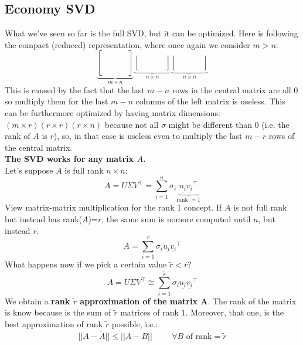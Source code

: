 \subsection{Economy SVD}
What we've seen so far is the full SVD, but it can be optimized. Here is following the compact (reduced) representation, where once again we consider $m > n$:
\[
\underbrace{
  \begin{bmatrix}
    & & & \\
    & & & \\
    & & & \\
    & & & \\
    & & & \\
  \end{bmatrix}}_{m \times n}
\underbrace{
  \begin{bmatrix}
    & & & \\
    & & & \\
    & & & \\
  \end{bmatrix}}_{n \times n}
\underbrace{
  \begin{bmatrix}
    & & & \\
    & & & \\
    & & & \\
  \end{bmatrix}}_{n \times n}
\]
This is caused by the fact that the last $m-n$ rows in the central matrix are all 0 so multiply them for the last $m-n$ columns of the left matrix is useless. This can be furthermore optimized by having matrix dimensions: $(m\times r)(r\times r)(r\times n)$ because not all $\sigma$ might be different than 0 (i.e. the rank of $A$ is $r$), so, in that case is useless even to multiply the last $m-r$ rows of the central matrix. \\

\textbf{The SVD works for any matrix $A$.}\\

\noindent Let's suppose $A$ is full rank $n\times n$:
\[
    A = U\Sigma V^\intercal = \sum_{i = 1}^{n} \sigma_i \underbrace{\underline{u_i}\underline{v_i}^\intercal}_{\text{rank }=1}    
\]
View matrix-matrix multiplication for the rank 1 concept.
If $A$ is not full rank but instead has rank($A$)=$r$, the same sum is nomore computed until $n$, but instead $r$.
\[
    A = \sum_{i = 1}^{r} \sigma_i \underline{u_i}\underline{v_i}^\intercal   
\]
What happens now if we pick a certain value $\tilde{r} < r$?
\[
    A = U\Sigma V^\intercal \cong \sum_{i = 1}^{\tilde{r}} \sigma_i \underline{u_i}\underline{v_i}^\intercal   
\]
We obtain a \textbf{rank $\tilde{r}$ approximation of the matrix A}. The rank of the matrix is know because is the sum of $\tilde{r}$ matrices of rank 1. Moreover, that one, is the best approximation of rank $\tilde{r}$ possible, i.e.:
\[
    ||A - \tilde{A}|| \leq ||A - B|| \hspace{1cm} \forall B  \text{ of rank} = \tilde{r}    
\]

